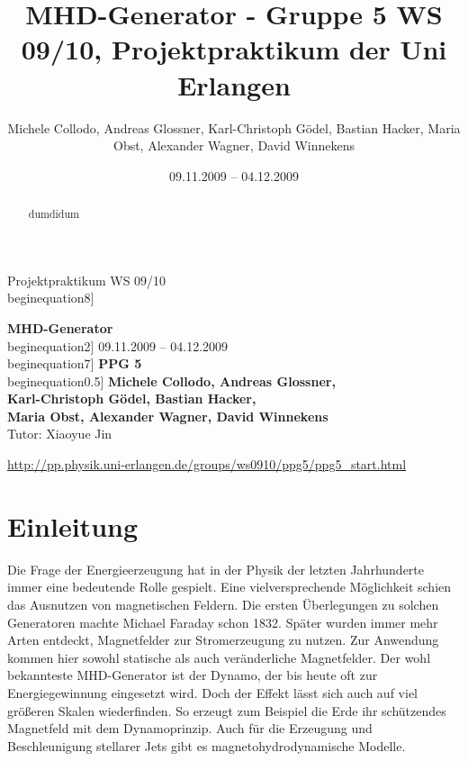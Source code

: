 \documentclass[11pt]{scrartcl}
\title{MHD-Generator - Gruppe 5 WS 09/10, Projektpraktikum der Uni Erlangen}
\date{09.11.2009 -- 04.12.2009}
\author{Michele Collodo, Andreas Glossner, Karl-Christoph G\"odel, Bastian Hacker, Maria Obst, Alexander Wagner, David Winnekens}
\begin{document}
\sloppy %
\thispagestyle{empty}
\large{Projektpraktikum WS 09/10}
\hfill
{}
\\begin{equation}8\baselineskip]
\begin{center}
{\fontsize{36}{54}\textbf{MHD-Generator}}
\\begin{equation}2\baselineskip]
{\Large 09.11.2009 -- 04.12.2009}
\\begin{equation}7\baselineskip]
{\huge\textbf{PPG 5}}\\begin{equation}0.5\baselineskip]
{\large\textbf{
Michele Collodo,
Andreas Glossner,\\
Karl-Christoph G\"odel,
Bastian Hacker,\\
Maria Obst,
Alexander Wagner,
David Winnekens}\\
Tutor: Xiaoyue Jin}
\vfill



\small{\url{http://pp.physik.uni-erlangen.de/groups/ws0910/ppg5/ppg5\_start.html}}
\end{center}
\newpage



\tableofcontents
\vfill



\begin{abstract}
dumdidum
\end{abstract}
\newpage


\section{Einleitung}	%
Die Frage der Energieerzeugung hat in der Physik der letzten Jahrhunderte immer eine bedeutende Rolle gespielt. Eine vielversprechende M\"oglichkeit schien das Ausnutzen von magnetischen Feldern. Die ersten \"Uberlegungen zu solchen Generatoren machte Michael Faraday schon 1832. Sp\"ater wurden immer mehr Arten entdeckt, Magnetfelder zur Stromerzeugung zu nutzen. Zur Anwendung kommen hier sowohl statische als auch ver\"anderliche Magnetfelder. Der wohl bekannteste MHD-Generator ist der Dynamo, der bis heute oft zur Energiegewinnung eingesetzt wird. Doch der Effekt l\"asst sich auch auf viel gr\"o\ss{}eren Skalen wiederfinden. So erzeugt zum Beispiel die Erde ihr sch\"utzendes Magnetfeld mit dem Dynamoprinzip. Auch f\"ur die Erzeugung und Beschleunigung stellarer Jets gibt es magnetohydrodynamische Modelle.
\end{document}
